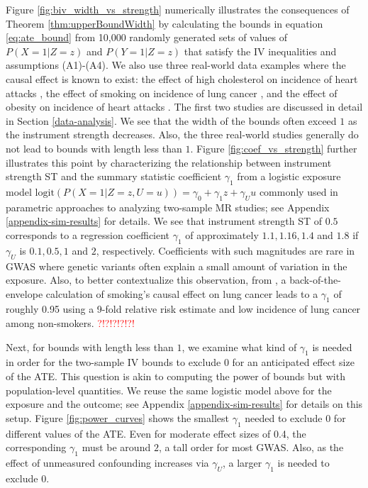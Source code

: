 \documentclass[
]{article}
\theoremstyle{plain}
\begin{document}
Figure \ref{fig:biv_width_vs_strength} numerically illustrates the consequences of Theorem \ref{thm:upperBoundWidth} by calculating the bounds in equation \eqref{eq:ate_bound} from 10,000 randomly generated sets of values of \(P(X = 1 | Z = z)\) and \(P(Y = 1 | Z = z)\) that satisfy the IV inequalities and assumptions (A1)-(A4). We also use three real-world data examples where the causal effect is known to exist: the effect of high cholesterol on incidence of heart attacks \autocite{cholesterol_treatment_trialists_ctt_collaborators_effects_2012}, the effect of smoking on incidence of lung cancer \autocite{cornfield_smoking_1959}, and the effect of obesity on incidence of heart attacks \autocite{yusuf_obesity_2005}. The first two studies are discussed in detail in Section \ref{data-analysis}. We see that the width of the bounds often exceed \(1\) as the instrument strength decreases. Also, the three real-world studies generally do not lead to bounds with length less than \(1\). Figure \ref{fig:coef_vs_strength} further illustrates this point by characterizing the relationship between instrument strength ST and the summary statistic coefficient \(\gamma_1\) from a logistic exposure model \(\text{logit}(P(X = 1 | Z = z, U = u)) = \gamma_0 + \gamma_1 z + \gamma_U u\) commonly used in parametric approaches to analyzing two-sample MR studies; see Appendix \ref{appendix-sim-results} for details. We see that instrument strength ST of \(0.5\) corresponds to a regression coefficient \(\gamma_1\) of approximately \(1.1, 1.16, 1.4\) and \(1.8\) if \(\gamma_U\) is \(0.1, 0.5, 1\) and \(2\), respectively. Coefficients with such magnitudes are rare in GWAS where genetic variants often explain a small amount of variation in the exposure. Also, to better contextualize this observation, from \autocite{united1964smoking}, a back-of-the-envelope calculation of smoking's causal effect on lung cancer leads to a \(\gamma_1\) of roughly 0.95 using a 9-fold relative risk estimate and low incidence of lung cancer among non-smokers. \textcolor{red}{?!?!?!?!?!}

Next, for bounds with length less than \(1\), we examine what kind of \(\gamma_1\) is needed in order for the two-sample IV bounds to exclude \(0\) for an anticipated effect size of the ATE. This question is akin to computing the power of bounds but with population-level quantities. We reuse the same logistic model above for the exposure and the outcome; see Appendix \ref{appendix-sim-results} for details on this setup. Figure \ref{fig:power_curves} shows the smallest \(\gamma_1\) needed to exclude \(0\) for different values of the ATE. Even for moderate effect sizes of 0.4, the corresponding \(\gamma_1\) must be around \(2\), a tall order for most GWAS. Also, as the effect of unmeasured confounding increases via \(\gamma_U\), a larger \(\gamma_1\) is needed to exclude \(0\).
\end{document}

